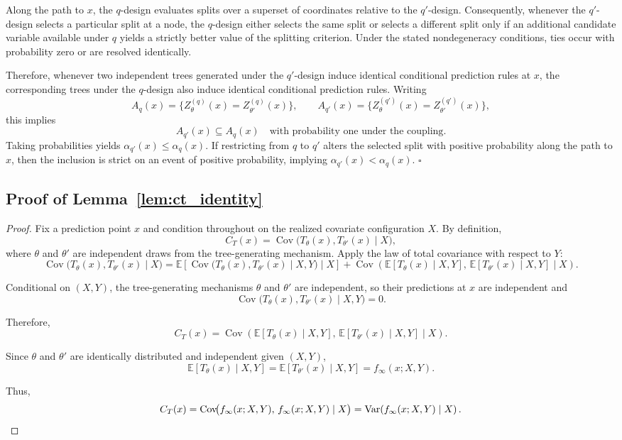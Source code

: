 \documentclass[11pt]{article}
\theoremstyle{plain}
\theoremstyle{definition}
\theoremstyle{remark}
\DeclareMathOperator{\Var}{Var}
\DeclareMathOperator{\Cov}{Cov}
\begin{document}
Along the path to $x$, the $q$-design evaluates splits over a superset of coordinates relative to the $q'$-design. Consequently, whenever the $q'$-design selects a particular split at a node, the $q$-design either selects the same split or selects a different split only if an additional candidate variable available under $q$ yields a strictly better value of the splitting criterion. Under the stated nondegeneracy conditions, ties occur with probability zero or are resolved identically.

Therefore, whenever two independent trees generated under the $q'$-design induce identical conditional prediction rules at $x$, the corresponding trees under the $q$-design also induce identical conditional prediction rules. Writing
\[
A_q(x)=\{Z_\theta^{(q)}(x)=Z_{\theta'}^{(q)}(x)\},
\qquad
A_{q'}(x)=\{Z_\theta^{(q')}(x)=Z_{\theta'}^{(q')}(x)\},
\]
this implies
\[
A_{q'}(x)\subseteq A_q(x)
\quad\text{with probability one under the coupling}.
\]
Taking probabilities yields $\alpha_{q'}(x)\le \alpha_q(x)$. If restricting from $q$ to $q'$ alters the selected split with positive probability along the path to $x$, then the inclusion is strict on an event of positive probability, implying $\alpha_{q'}(x)<\alpha_q(x)$. \hfill$\square$


\subsection{Proof of Lemma~\ref{lem:ct_identity}}
\label{app:ct_identity}
\begin{proof}
	Fix a prediction point $x$ and condition throughout on the realized covariate configuration $X$. By definition,
	\[
	C_T(x)
	=
	\Cov\!\bigl(T_\theta(x),T_{\theta'}(x)\mid X\bigr),
	\]
	where $\theta$ and $\theta'$ are independent draws from the tree-generating mechanism. Apply the law of total covariance with respect to $Y$:
	\[
	\Cov\!\bigl(T_\theta(x),T_{\theta'}(x)\mid X\bigr)
	=
	\mathbb E\!\left[
	\Cov\!\bigl(T_\theta(x),T_{\theta'}(x)\mid X,Y\bigr)
	\mid X
	\right]
	+
	\Cov\!\left(
	\mathbb E[T_\theta(x)\mid X,Y],\,
	\mathbb E[T_{\theta'}(x)\mid X,Y]
	\mid X
	\right).
	\]
	
	Conditional on $(X,Y)$, the tree-generating mechanisms $\theta$ and $\theta'$ are independent, so their predictions at $x$ are independent and
	\[
	\Cov\!\bigl(T_\theta(x),T_{\theta'}(x)\mid X,Y\bigr)
	=
	0.
	\]
	
	Therefore,
	\[
	C_T(x)
	=
	\Cov\!\left(
	\mathbb E[T_\theta(x)\mid X,Y],\,
	\mathbb E[T_{\theta'}(x)\mid X,Y]
	\mid X
	\right).
	\]
	
	Since $\theta$ and $\theta'$ are identically distributed and independent given $(X,Y)$,
	\[
	\mathbb E[T_\theta(x)\mid X,Y]
	=
	\mathbb E[T_{\theta'}(x)\mid X,Y]
	=
	f_\infty(x;X,Y).
	\]
	
	Thus,
	\[
	C_T(x)
	=
	\Cov\!\bigl(f_\infty(x;X,Y),\,f_\infty(x;X,Y)\mid X\bigr)
	=
	\Var\!\left(f_\infty(x;X,Y)\mid X\right).
	\qedhere
	\]
\end{proof}
\end{document}
